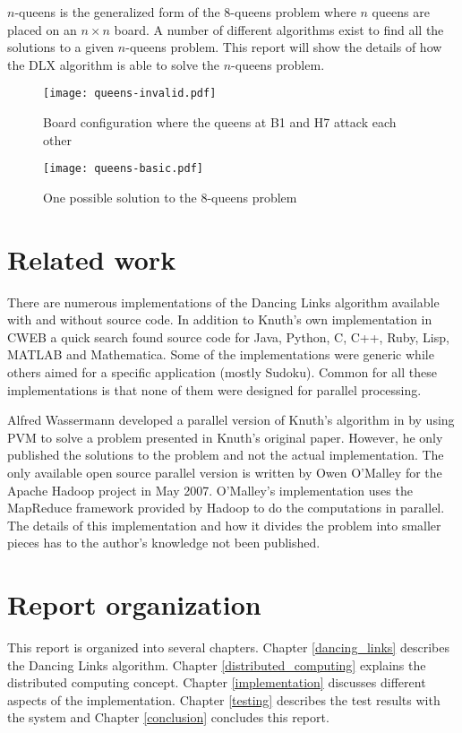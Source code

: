 $n$-queens is the generalized form of the 8-queens problem where $n$ queens are placed on an $n \times n$ board.
A number of different algorithms exist to find all the solutions to a given $n$-queens problem.
This report will show the details of how the DLX algorithm is able to solve the $n$-queens problem.

\begin{figure}[hptb]
	\centering 
	\texttt{[image: queens-invalid.pdf]}
	\caption{Board configuration where the queens at B1 and H7 attack each other}
	\label{fig:8queens-invalid}
\end{figure}

\begin{figure}[hptb]
	\centering 
	\texttt{[image: queens-basic.pdf]}
	\caption{One possible solution to the 8-queens problem}
	\label{fig:8queens}
\end{figure}



\section{Related work}

There are numerous implementations of the Dancing Links algorithm available with and without source code.
In addition to Knuth's own implementation in CWEB \cite{cweb} a quick search found source code for Java, Python, C, C++, Ruby, Lisp, MATLAB and Mathematica.
Some of the implementations were generic while others aimed for a specific application (mostly Sudoku).
Common for all these implementations is that none of them were designed for parallel processing.

Alfred Wassermann developed a parallel version of Knuth's algorithm in \cite{wassermann99covering} by using PVM \cite{pvm} to solve a problem presented in Knuth's original paper.
However, he only published the solutions to the problem and not the actual implementation.
The only available open source parallel version is written by Owen O'Malley for the Apache Hadoop project \cite{hadoop} in May 2007.
O'Malley's implementation uses the MapReduce framework \cite{map-reduce} provided by Hadoop to do the computations in parallel.
The details of this implementation and how it divides the problem into smaller pieces has to the author's knowledge not been published.



\section{Report organization}

This report is organized into several chapters.
Chapter \ref{dancing_links} describes the Dancing Links algorithm.
Chapter \ref{distributed_computing} explains the distributed computing concept.
Chapter \ref{implementation} discusses different aspects of the implementation.
Chapter \ref{testing} describes the test results with the system and Chapter \ref{conclusion} concludes this report.
